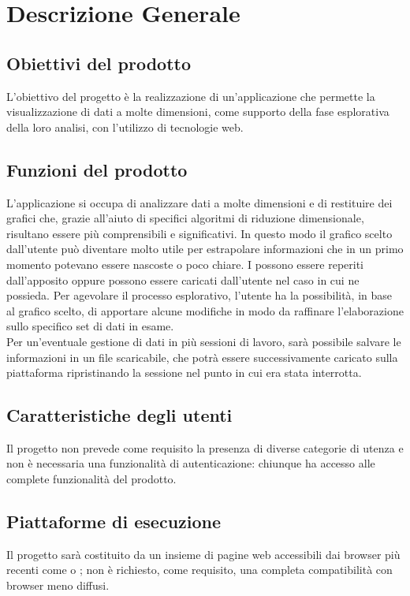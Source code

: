 \section{Descrizione Generale}
\subsection{Obiettivi del prodotto}
L'obiettivo del progetto è la realizzazione di un'applicazione che permette la visualizzazione di dati a molte dimensioni, come supporto della fase esplorativa della loro analisi, con l'utilizzo di tecnologie web.
\subsection{Funzioni del prodotto}
L'applicazione si occupa di analizzare dati a molte dimensioni e di restituire dei grafici che, grazie all'aiuto di specifici algoritmi di riduzione dimensionale, risultano essere più comprensibili e significativi. In questo modo il grafico scelto dall'utente può diventare molto utile per estrapolare informazioni che in un primo momento potevano essere nascoste o poco chiare. I  possono essere reperiti dall'apposito  oppure possono essere caricati dall'utente nel caso in cui ne possieda. Per agevolare il processo esplorativo, l'utente ha la possibilità, in base al grafico scelto, di apportare alcune modifiche in modo da raffinare l'elaborazione sullo specifico set di dati in esame.\\ Per un'eventuale gestione di dati in più sessioni di lavoro, sarà possibile salvare le informazioni in un file scaricabile, che potrà essere successivamente caricato sulla piattaforma ripristinando la sessione nel punto in cui era stata interrotta.
\subsection{Caratteristiche degli utenti}
Il progetto non prevede come requisito la presenza di diverse categorie di utenza e non è necessaria una funzionalità di autenticazione: chiunque ha accesso alle complete funzionalità del prodotto. 
\subsection{Piattaforme di esecuzione}
Il progetto sarà costituito da un insieme di pagine web accessibili dai browser più recenti come  o ; non è richiesto, come requisito, una completa compatibilità con browser meno diffusi.
